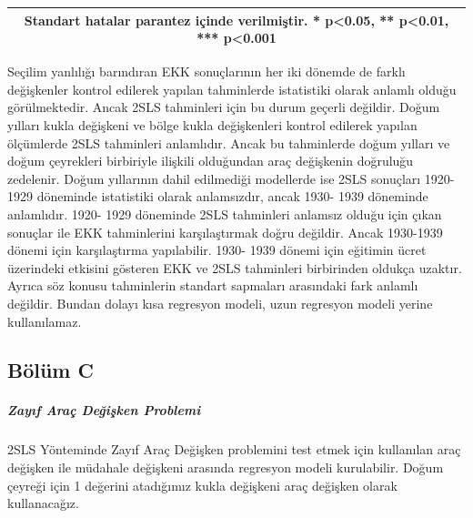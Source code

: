 \documentclass[12pt, a4paper, showtrims]{article}
\begin{document}
\begin{justify}
\begin{justify}
\begin{justify}
\begin{justify}
\begin{table}[h]
\begin{tabular}{|p{4cm}||p{2.5cm}|p{2.5cm}||p{2.5cm}|p{2.5cm}|}
        \hline
        \multicolumn{5}{|c|}{Standart hatalar parantez içinde verilmiştir. * p<0.05, ** p<0.01, *** p<0.001} \\
        \hline
        \end{tabular}
    \end{table}     
    
    Seçilim yanlılığı barındıran EKK sonuçlarının her iki dönemde de farklı değişkenler 
    kontrol edilerek yapılan tahminlerde istatistiki olarak anlamlı olduğu görülmektedir.
    Ancak 2SLS tahminleri için bu durum geçerli değildir. Doğum yılları kukla değişkeni ve
    bölge kukla değişkenleri kontrol edilerek yapılan ölçümlerde 2SLS tahminleri anlamlıdır.
    Ancak bu tahminlerde doğum yılları ve doğum çeyrekleri birbiriyle ilişkili olduğundan 
    araç değişkenin doğruluğu zedelenir. Doğum yıllarının dahil edilmediği modellerde ise 2SLS 
    sonuçları 1920- 1929 döneminde istatistiki olarak anlamsızdır, ancak 1930- 1939 döneminde 
    anlamlıdır. 1920- 1929 döneminde 2SLS tahminleri anlamsız olduğu için çıkan sonuçlar ile 
    EKK tahminlerini karşılaştırmak doğru değildir. Ancak 1930-1939 dönemi için karşılaştırma
    yapılabilir. 1930- 1939 dönemi için eğitimin ücret üzerindeki etkisini gösteren EKK ve 2SLS tahminleri
    birbirinden oldukça uzaktır. Ayrıca söz konusu tahminlerin standart sapmaları arasındaki fark 
    anlamlı değildir. Bundan dolayı kısa regresyon modeli, uzun regresyon modeli yerine kullanılamaz.

    
    \end{justify}

    \newpage
    \subsection*{Bölüm C}
    \setlength{\parindent}{0em}
    \setlength{\parskip}{0.3em}

    \subparagraph{Zayıf Araç Değişken Problemi}  
    \begin{justify}
    \setlength{\parindent}{0em}

    2SLS Yönteminde Zayıf Araç Değişken problemini test etmek için kullanılan araç değişken ile
    müdahale değişkeni arasında regresyon modeli kurulabilir. Doğum çeyreği için 1 değerini 
    atadığımız kukla değişkeni araç değişken olarak kullanacağız.


\end{justify}
\end{justify}
\end{justify}
\end{justify}
\end{document}
